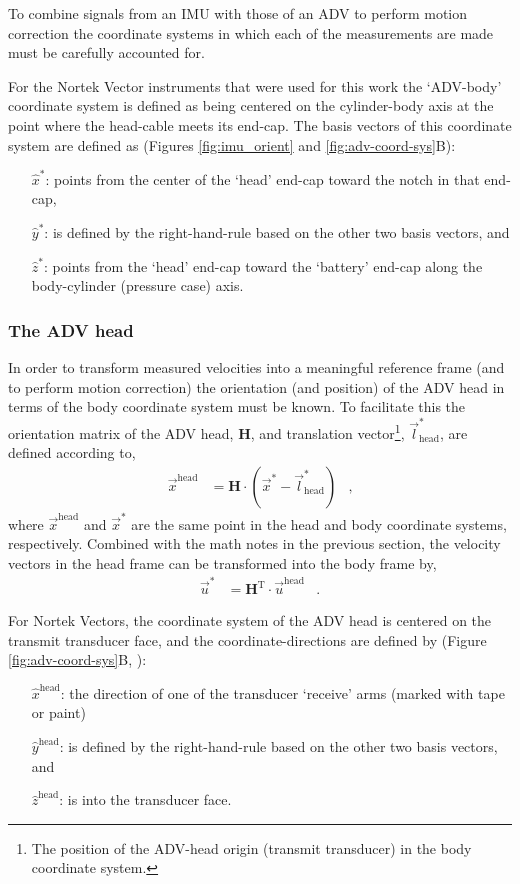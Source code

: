 \documentclass[twocol]{ametsoc}
\def\rmat{\ensuremath{\mathbf{H}}}
\def\bhv{\ensuremath{\vec{l}_\mathrm{head}^*}}
\begin{document}
To combine signals from an IMU with those of an ADV to perform motion correction the coordinate systems in which each of the measurements are made must be carefully accounted for. 

For the Nortek Vector instruments that were used for this work the `ADV-body' coordinate system is defined as being centered on the cylinder-body axis at the point where the head-cable meets its end-cap.  The basis vectors of this coordinate system are defined as (Figures \ref{fig:imu_orient} and \ref{fig:adv-coord-sys}B):
\begin{itemize}
\item[$\hat{x}^*$:] points from the center of the `head' end-cap toward the notch in that end-cap,
\item[$\hat{y}^*$:] is defined by the right-hand-rule based on the other two basis vectors, and
\item[$\hat{z}^*$:] points from the `head' end-cap toward the `battery' end-cap along the body-cylinder (pressure case) axis.
\end{itemize}

\subsubsection{The ADV head}

In order to transform measured velocities into a meaningful reference frame (and to perform motion correction) the orientation (and position) of the ADV head in terms of the body coordinate system must be known. To facilitate this the orientation matrix of the ADV head, $\rmat$, and translation vector\footnote{The position of the ADV-head origin (transmit transducer) in the body coordinate system.}, $\bhv$, are defined according to,
\begin{align}
  \label{eqn:coord_sys}
  \vec{x}^\mathrm{head} &= \rmat \cdot (\vec{x}^* - \bhv) & ,
\end{align}
where $\vec{x}^\mathrm{head}$ and $\vec{x}^*$ are the same point in the head and body coordinate systems, respectively. Combined with the math notes in the previous section, the velocity vectors in the head frame can be transformed into the body frame by,
\begin{align}
  \label{eqn:coord_sys2}
  \vec{u}^* &=  \rmat^\mathrm{T} \cdot \vec{u}^\mathrm{head} & .
\end{align}

For Nortek Vectors, the coordinate system of the ADV head is centered on the transmit transducer face, and the coordinate-directions are defined by (Figure \ref{fig:adv-coord-sys}B, \cite{vector_manual2005}):
\begin{itemize}
\item[$\hat{x}^\mathrm{head}$:] the direction of one of the transducer `receive' arms (marked with tape or paint)
\item[$\hat{y}^\mathrm{head}$:] is defined by the right-hand-rule based on the other two basis vectors, and
\item[$\hat{z}^\mathrm{head}$:] is into the transducer face.
\end{itemize}
\end{document}
